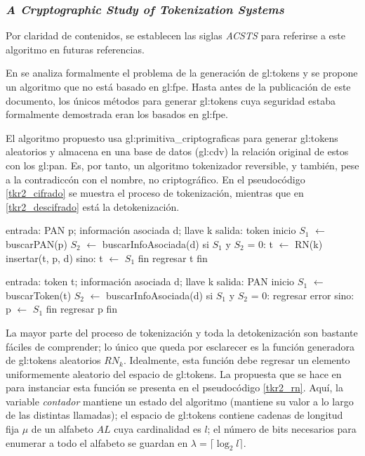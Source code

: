 %
%

\subsubsection{\textit{A Cryptographic Study of Tokenization Systems}}

Por claridad de contenidos, se establecen las siglas \textit{ACSTS} para
referirse a este algoritmo en futuras referencias.

En \cite{doc_sandra} se analiza formalmente el problema de la generación de
\glspl{gl:token} y se propone un algoritmo que no está basado en \gls{gl:fpe}.
Hasta antes de la publicación de este documento, los únicos métodos para
generar \glspl{gl:token} cuya seguridad estaba formalmente demostrada eran los
basados en \gls{gl:fpe}.

El algoritmo propuesto usa \glspl{gl:primitiva_criptografica} para generar
\glspl{gl:token} aleatorios y almacena en una base de datos (\gls{gl:cdv}) la
relación original de estos con los \gls{gl:pan}. Es, por tanto, un algoritmo
tokenizador reversible, y también, pese a la contradiccón con el nombre, no
criptográfico.  En el pseudocódigo \ref{tkr2_cifrado} se muestra el proceso
de tokenización, mientras que en \ref{tkr2_descifrado} está la detokenización.

\begin{pseudocodigo}[%
    caption={\textit{ACSTS}, método de tokenización},
    label={tkr2_cifrado}%
  ]
  entrada: PAN p; información asociada d; llave k
  salida:  token
  inicio
    $ S_1 $ $ \gets $ buscarPAN(p)
    $ S_2 $ $ \gets $ buscarInfoAsociada(d)
    si $ S_1 $ y $ S_2 $ = 0:
      t $ \gets $ RN(k)
      insertar(t, p, d)
    sino:
      t $ \gets $ $ S_1 $
    fin
    regresar t
  fin
\end{pseudocodigo}

\begin{pseudocodigo}[%
    caption={\textit{ACSTS}, método de detokenización},
    label={tkr2_descifrado}%
  ]
  entrada: token t; información asociada d; llave k
  salida:  PAN
  inicio
    $ S_1 $ $ \gets $ buscarToken(t)
    $ S_2 $ $ \gets $ buscarInfoAsociada(d)
    si $ S_1 $ y $ S_2 $ = 0:
      regresar error
    sino:
      p $ \gets $ $ S_1 $
    fin
    regresar p
  fin
\end{pseudocodigo}

La mayor parte del proceso de tokenización y toda la detokenización son
bastante fáciles de comprender; lo único que queda por esclarecer es la
función generadora de \glspl{gl:token} aleatorios $ RN_k $. Idealmente,
esta función debe regresar un elemento uniformemente aleatorio del espacio
de \glspl{gl:token}. La propuesta que se hace en \cite{doc_sandra} para
instanciar esta función se presenta en el pseudocódigo \ref{tkr2_rn}.
Aquí, la variable \textit{contador} mantiene un estado del algoritmo (mantiene
su valor a lo largo de las distintas llamadas); el espacio de \glspl{gl:token}
contiene cadenas de longitud fija $ \mu $ de un alfabeto $ AL $ cuya
cardinalidad es $ l $; el número de bits necesarios para enumerar a todo el
alfabeto se guardan en $ \lambda = \lceil \log_2 l \rceil$.

